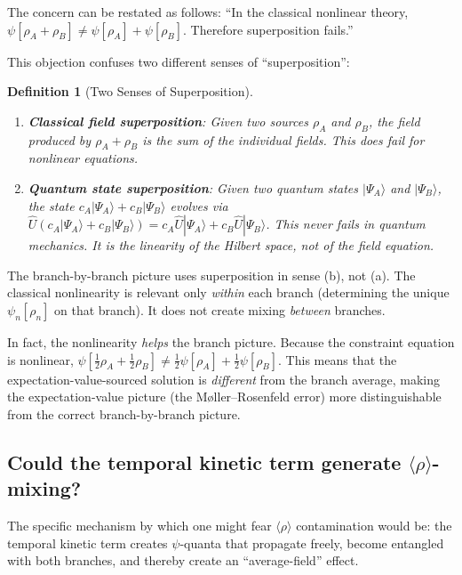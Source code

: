 \documentclass[12pt,a4paper]{article}
\newtheorem{definition}[theorem]{Definition}
\begin{document}
The concern can be restated as follows: ``In the classical nonlinear
theory, $\psi[\rho_A + \rho_B] \neq \psi[\rho_A] + \psi[\rho_B]$.
Therefore superposition fails.''

This objection confuses two different senses of ``superposition'':

\begin{definition}[Two Senses of Superposition]
\label{def:superposition}
\begin{enumerate}
\item[(a)] \textbf{Classical field superposition}: Given two sources
$\rho_A$ and $\rho_B$, the field produced by $\rho_A + \rho_B$ is the
sum of the individual fields. This \emph{does fail} for nonlinear
equations.

\item[(b)] \textbf{Quantum state superposition}: Given two quantum states
$|\Psi_A\rangle$ and $|\Psi_B\rangle$, the state
$c_A|\Psi_A\rangle + c_B|\Psi_B\rangle$ evolves via
$\hat{U}(c_A|\Psi_A\rangle + c_B|\Psi_B\rangle)
= c_A\hat{U}|\Psi_A\rangle + c_B\hat{U}|\Psi_B\rangle$. This
\emph{never fails} in quantum mechanics. It is the linearity of the
Hilbert space, not of the field equation.
\end{enumerate}
\end{definition}

The branch-by-branch picture uses superposition in sense (b), not (a).
The classical nonlinearity is relevant only \emph{within} each branch
(determining the unique $\psi_n[\rho_n]$ on that branch). It does not
create mixing \emph{between} branches.

In fact, the nonlinearity \emph{helps} the branch picture. Because the
constraint equation is nonlinear,
$\psi[\frac{1}{2}\rho_A + \frac{1}{2}\rho_B] \neq
\frac{1}{2}\psi[\rho_A] + \frac{1}{2}\psi[\rho_B]$.
This means that the expectation-value-sourced solution is \emph{different}
from the branch average, making the expectation-value picture (the
M{\o}ller--Rosenfeld error) more distinguishable from the correct
branch-by-branch picture.

\subsection{Could the temporal kinetic term generate $\langle\rho\rangle$-mixing?}

The specific mechanism by which one might fear $\langle\rho\rangle$
contamination would be: the temporal kinetic term creates $\psi$-quanta
that propagate freely, become entangled with both branches, and thereby
create an ``average-field'' effect.
\end{document}
